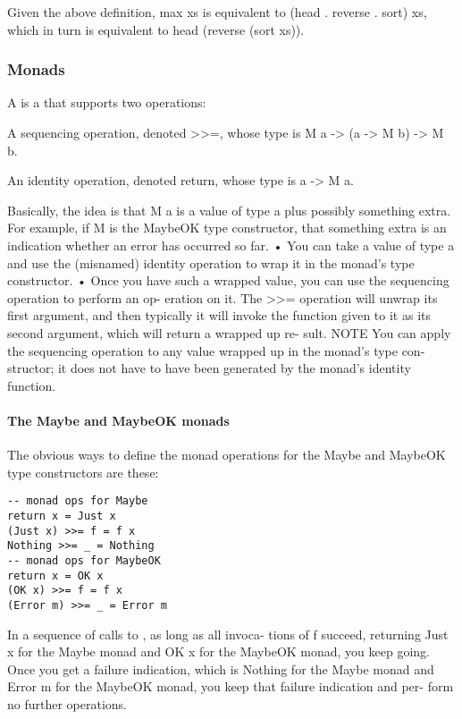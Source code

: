 Given the above definition, max xs is equivalent
to (head . reverse . sort) xs, which in turn is
equivalent to head (reverse (sort xs)).

\subsubsection{Monads}
A  is a   that supports two
operations:
\begin{compactitem}
\item A sequencing operation, denoted >>=, whose
type is M a -> (a -> M b) -> M b.
\item An identity operation, denoted return, whose
type is a -> M a.
\end{compactitem}
Basically, the idea is that M a is a value of type a
plus possibly something extra. For example, if M is
the MaybeOK type constructor, that something extra
is an indication whether an error has occurred so
far.
• You can take a value of type a and use the
(misnamed) identity operation to wrap it in
the monad’s type constructor.
• Once you have such a wrapped value, you can
use the sequencing operation to perform an op-
eration on it. The >>= operation will unwrap
its first argument, and then typically it will
invoke the function given to it as its second
argument, which will return a wrapped up re-
sult.
NOTE You can apply the sequencing operation to
any value wrapped up in the monad’s type con-
structor; it does not have to have been generated
by the monad’s identity function.


\paragraph{The Maybe and MaybeOK monads}
The obvious ways to define the monad operations
for the Maybe and MaybeOK type constructors are
these:
\begin{lstlisting}
-- monad ops for Maybe
return x = Just x
(Just x) >>= f = f x
Nothing >>= _ = Nothing
-- monad ops for MaybeOK
return x = OK x
(OK x) >>= f = f x
(Error m) >>= _ = Error m
\end{lstlisting}
In a sequence of calls to \e{$>>=$}, as long as all invoca-
tions of f succeed, returning Just x for the Maybe
monad and OK x for the MaybeOK monad, you keep
going.
Once you get a failure indication, which is Nothing
for the Maybe monad and Error m for the MaybeOK
monad, you keep that failure indication and per-
form no further operations.


